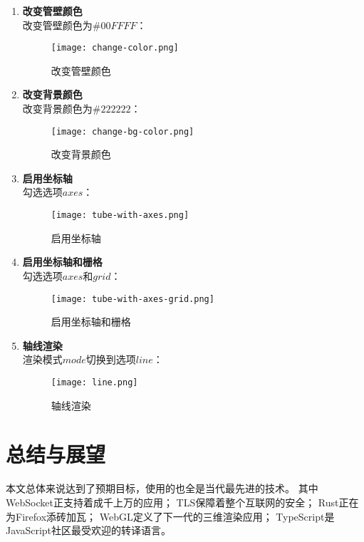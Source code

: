 \begin{enumerate}

\item \textbf{改变管壁颜色} \\
改变管壁颜色为$\#00FFFF$：
\FloatBarrier
\begin{figure}
\centering
\texttt{[image: change-color.png]}
\caption{改变管壁颜色}
\label{fig:change-color}
\end{figure}
\FloatBarrier

\item \textbf{改变背景颜色} \\
改变背景颜色为$\#222222$：

\FloatBarrier
\begin{figure}
\centering
\texttt{[image: change-bg-color.png]}
\caption{改变背景颜色}
\label{fig:change-bg-color}
\end{figure}
\FloatBarrier

\item \textbf{启用坐标轴} \\
勾选选项$axes$：

\FloatBarrier
\begin{figure}
\centering
\texttt{[image: tube-with-axes.png]}
\caption{启用坐标轴}
\label{fig:tube-with-axes}
\end{figure}
\FloatBarrier

\item \textbf{启用坐标轴和栅格} \\
勾选选项$axes$和$grid$：

\FloatBarrier
\begin{figure}
\centering
\texttt{[image: tube-with-axes-grid.png]}
\caption{启用坐标轴和栅格}
\label{fig:tube-with-axes-grid}
\end{figure}
\FloatBarrier

\item \textbf{轴线渲染} \\
渲染模式$mode$切换到选项$line$：

\FloatBarrier
\begin{figure}
\centering
\texttt{[image: line.png]}
\caption{轴线渲染}
\label{fig:line}
\end{figure}
\FloatBarrier

\end{enumerate}

\clearpage

\section{总结与展望}
本文总体来说达到了预期目标，使用的也全是当代最先进的技术。
其中WebSocket正支持着成千上万的应用；
TLS保障着整个互联网的安全；
Rust正在为Firefox添砖加瓦；
WebGL定义了下一代的三维渲染应用；
TypeScript是JavaScript社区最受欢迎的转译语言。


